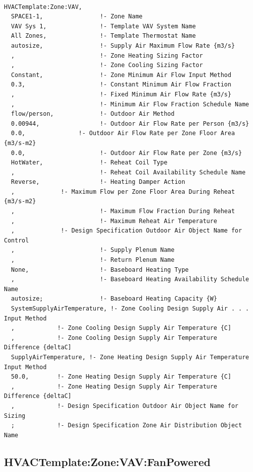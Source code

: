 \begin{lstlisting}

HVACTemplate:Zone:VAV,
  SPACE1-1,                !- Zone Name
  VAV Sys 1,               !- Template VAV System Name
  All Zones,               !- Template Thermostat Name
  autosize,                !- Supply Air Maximum Flow Rate {m3/s}
  ,                        !- Zone Heating Sizing Factor
  ,                        !- Zone Cooling Sizing Factor
  Constant,                !- Zone Minimum Air Flow Input Method
  0.3,                     !- Constant Minimum Air Flow Fraction
  ,                        !- Fixed Minimum Air Flow Rate {m3/s}
  ,                        !- Minimum Air Flow Fraction Schedule Name
  flow/person,             !- Outdoor Air Method
  0.00944,                 !- Outdoor Air Flow Rate per Person {m3/s}
  0.0,               !- Outdoor Air Flow Rate per Zone Floor Area {m3/s-m2}
  0.0,                     !- Outdoor Air Flow Rate per Zone {m3/s}
  HotWater,                !- Reheat Coil Type
  ,                        !- Reheat Coil Availability Schedule Name
  Reverse,                 !- Heating Damper Action
  ,             !- Maximum Flow per Zone Floor Area During Reheat {m3/s-m2}
  ,                        !- Maximum Flow Fraction During Reheat
  ,                        !- Maximum Reheat Air Temperature
  ,             !- Design Specification Outdoor Air Object Name for Control
  ,                        !- Supply Plenum Name
  ,                        !- Return Plenum Name
  None,                    !- Baseboard Heating Type
  ,                        !- Baseboard Heating Availability Schedule Name
  autosize;                !- Baseboard Heating Capacity {W}
  SystemSupplyAirTemperature, !- Zone Cooling Design Supply Air . . . Input Method
  ,            !- Zone Cooling Design Supply Air Temperature {C]
  ,            !- Zone Cooling Design Supply Air Temperature Difference {deltaC]
  SupplyAirTemperature, !- Zone Heating Design Supply Air Temperature Input Method
  50.0,        !- Zone Heating Design Supply Air Temperature {C]
  ,            !- Zone Heating Design Supply Air Temperature Difference {deltaC]
  ,            !- Design Specification Outdoor Air Object Name for Sizing
  ;            !- Design Specification Zone Air Distribution Object Name
\end{lstlisting}

\subsection{HVACTemplate:Zone:VAV:FanPowered}\label{hvactemplatezonevavfanpowered}

